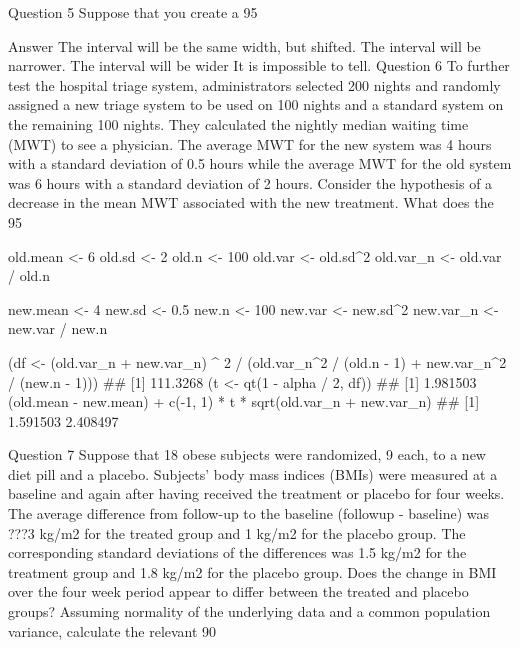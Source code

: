 Question 5
Suppose that you create a 95%

Answer
The interval will be the same width, but shifted.
The interval will be narrower.
The interval will be wider
It is impossible to tell.
Question 6
To further test the hospital triage system, administrators selected 200 nights and randomly assigned a new triage system to be used on 100 nights and a standard system on the remaining 100 nights. They calculated the nightly median waiting time (MWT) to see a physician. The average MWT for the new system was 4 hours with a standard deviation of 0.5 hours while the average MWT for the old system was 6 hours with a standard deviation of 2 hours. Consider the hypothesis of a decrease in the mean MWT associated with the new treatment. What does the 95%

old.mean <- 6
old.sd <- 2
old.n <- 100
old.var <- old.sd^2
old.var_n <- old.var / old.n

new.mean <- 4
new.sd <- 0.5
new.n <- 100
new.var <- new.sd^2
new.var_n <- new.var / new.n

(df <- (old.var_n + new.var_n) ^ 2 / 
   (old.var_n^2 / (old.n - 1) + new.var_n^2 / (new.n - 1)))
## [1] 111.3268
(t <- qt(1 - alpha / 2, df))
## [1] 1.981503
(old.mean - new.mean) + c(-1, 1) * t * sqrt(old.var_n + new.var_n)
## [1] 1.591503 2.408497


Question 7
Suppose that 18 obese subjects were randomized, 9 each, to a new diet pill and a placebo. Subjects’ body mass indices (BMIs) were measured at a baseline and again after having received the treatment or placebo for four weeks. The average difference from follow-up to the baseline (followup - baseline) was ???3 kg/m2 for the treated group and 1 kg/m2 for the placebo group. The corresponding standard deviations of the differences was 1.5 kg/m2 for the treatment group and 1.8 kg/m2 for the placebo group. Does the change in BMI over the four week period appear to differ between the treated and placebo groups? Assuming normality of the underlying data and a common population variance, calculate the relevant 90%


